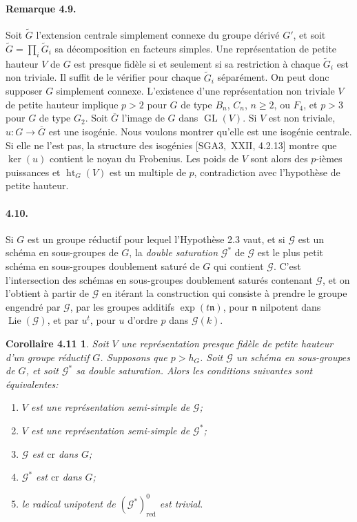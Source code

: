 \documentclass[11pt]{article}
\newcommand{\Lie}{\operatorname{Lie}}
\newcommand{\GL}{\operatorname{GL}}
\newcommand{\red}{\mathrm{red}}
\newcommand{\htG}{\operatorname{ht}_G}
\newtheorem*{corollaire411}{Corollaire 4.11}
\begin{document}
\paragraph{Remarque 4.9.}
Soit \(\widetilde G\) l'extension centrale simplement connexe du groupe dérivé \(G'\), et
soit \(\widetilde G=\prod_i\widetilde G_i\) sa décomposition en facteurs simples. Une
représentation de petite hauteur \(V\) de \(G\) est presque fidèle si et seulement si sa
restriction à chaque \(\widetilde G_i\) est non triviale. Il suffit de le vérifier pour
chaque \(\widetilde G_i\) séparément. On peut donc supposer \(G\) simplement connexe.
L'existence d'une représentation non triviale \(V\) de petite hauteur implique \(p>2\)
pour \(G\) de type \(B_n\), \(C_n\), \(n\ge2\), ou \(F_4\), et \(p>3\) pour \(G\) de
type \(G_2\). Soit \(\overline G\) l'image de \(G\) dans \(\GL(V)\). Si \(V\) est non
triviale, \(u:G\to\overline G\) est une isogénie. Nous voulons montrer qu'elle est une
isogénie centrale. Si elle ne l'est pas, la structure des isogénies
\([\mathrm{SGA3},\) XXII, 4.2.13] montre que \(\ker(u)\) contient le noyau du Frobenius.
Les poids de \(V\) sont alors des \(p\)-ièmes puissances et \(\htG(V)\) est un multiple de
\(p\), contradiction avec l'hypothèse de petite hauteur.

\paragraph{4.10.}
Si \(G\) est un groupe réductif pour lequel l'Hypothèse 2.3 vaut, et si \(\mathcal G\)
est un schéma en sous-groupes de \(G\), la \emph{double saturation} \(\mathcal G^*\) de
\(\mathcal G\) est le plus petit schéma en sous-groupes doublement saturé de \(G\) qui
contient \(\mathcal G\). C'est l'intersection des schémas en sous-groupes doublement
saturés contenant \(\mathcal G\), et on l'obtient à partir de \(\mathcal G\) en itérant la
construction qui consiste à prendre le groupe engendré par \(\mathcal G\), par les
groupes additifs \(\exp(t\mathfrak n)\), pour \(\mathfrak n\) nilpotent dans
\(\Lie(\mathcal G)\), et par \(u^t\), pour \(u\) d'ordre \(p\) dans \(\mathcal G(k)\).

\begin{corollaire411}
Soit \(V\) une représentation presque fidèle de petite hauteur d'un groupe réductif
\(G\). Supposons que \(p>h_G\). Soit \(\mathcal G\) un schéma en sous-groupes de \(G\), et
soit \(\mathcal G^*\) sa double saturation. Alors les conditions suivantes sont
équivalentes:
\begin{enumerate}[label=(\roman*),leftmargin=2em]
\item \(V\) est une représentation semi-simple de \(\mathcal G\);
\item \(V\) est une représentation semi-simple de \(\mathcal G^*\);
\item \(\mathcal G\) est \(\mathrm{cr}\) dans \(G\);
\item \(\mathcal G^*\) est \(\mathrm{cr}\) dans \(G\);
\item le radical unipotent de \((\mathcal G^*)^0_{\red}\) est trivial.
\end{enumerate}
\end{corollaire411}
\end{document}
